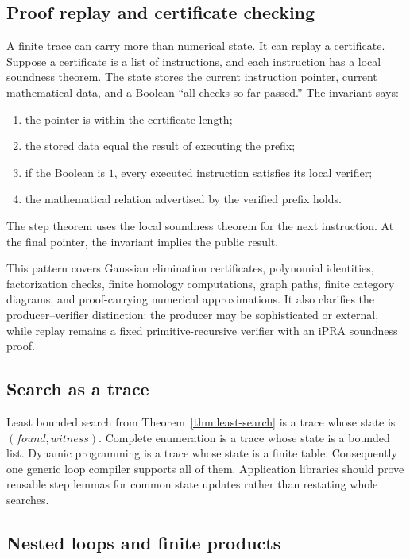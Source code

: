 \subsection{Proof replay and certificate checking}

A finite trace can carry more than numerical state.  It can replay a certificate.  Suppose a certificate is
a list of instructions, and each instruction has a local soundness theorem.  The state stores the current
instruction pointer, current mathematical data, and a Boolean ``all checks so far passed.''  The invariant
says:
\begin{enumerate}
  \item the pointer is within the certificate length;
  \item the stored data equal the result of executing the prefix;
  \item if the Boolean is \(1\), every executed instruction satisfies its local verifier;
  \item the mathematical relation advertised by the verified prefix holds.
\end{enumerate}
The step theorem uses the local soundness theorem for the next instruction.  At the final pointer, the
invariant implies the public result.

This pattern covers Gaussian elimination certificates, polynomial identities, factorization checks,
finite homology computations, graph paths, finite category diagrams, and proof-carrying numerical
approximations.  It also clarifies the producer--verifier distinction: the producer may be sophisticated or
external, while replay remains a fixed primitive-recursive verifier with an iPRA soundness proof.

\subsection{Search as a trace}

Least bounded search from Theorem~\ref{thm:least-search} is a trace whose state is
\((\mathit{found},\mathit{witness})\).  Complete enumeration is a trace whose state is a bounded list.
Dynamic programming is a trace whose state is a finite table.  Consequently one generic loop compiler
supports all of them.  Application libraries should prove reusable step lemmas for common state updates
rather than restating whole searches.

\subsection{Nested loops and finite products}

